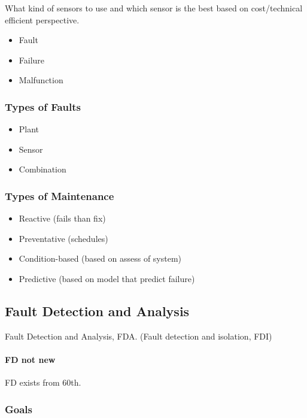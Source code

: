 \documentclass[class=article, crop=false]{standalone}
\begin{document}
What kind of sensors to use and which sensor is the best based on
cost/technical efficient perspective.

\begin{itemize}
    \item Fault
    \item Failure   
    \item Malfunction
\end{itemize}

\subsubsection{Types of Faults}
\begin{itemize}
    \item Plant
    \item Sensor
    \item Combination
\end{itemize}

\subsubsection{Types of Maintenance}
\begin{itemize}
    \item{Reactive (fails than fix)}
    \item{Preventative (schedules)}
    \item{Condition-based (based on assess of system)}
    \item{Predictive (based on model that predict failure)}
\end{itemize}






% 

\subsection{Fault Detection and Analysis}
Fault Detection and Analysis, FDA. (Fault detection and isolation, FDI) 

\paragraph{FD not new}
FD exists from 60th.

\subsubsection{Goals}
\end{document}
